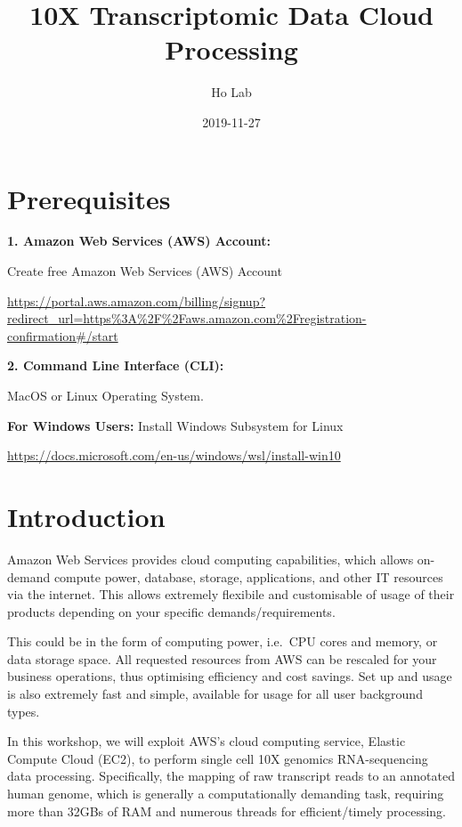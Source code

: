 \documentclass[]{book}
\title{10X Transcriptomic Data Cloud Processing}
\author{Ho Lab}
\date{2019-11-27}
\begin{document}
\maketitle

{
\setcounter{tocdepth}{1}
\tableofcontents
}
\hypertarget{prerequisites}{%
\chapter{Prerequisites}\label{prerequisites}}

\textbf{1. Amazon Web Services (AWS) Account:}

Create free Amazon Web Services (AWS) Account

\url{https://portal.aws.amazon.com/billing/signup?redirect_url=https\%3A\%2F\%2Faws.amazon.com\%2Fregistration-confirmation\#/start}

\textbf{2. Command Line Interface (CLI):}

MacOS or Linux Operating System.

\textbf{For Windows Users:}
Install Windows Subsystem for Linux

\url{https://docs.microsoft.com/en-us/windows/wsl/install-win10}

\hypertarget{intro}{%
\chapter{Introduction}\label{intro}}

Amazon Web Services provides cloud computing capabilities, which allows on-demand compute power, database, storage, applications, and other IT resources via the internet. This allows extremely flexibile and customisable of usage of their products depending on your specific demands/requirements.

This could be in the form of computing power, i.e.~CPU cores and memory, or data storage space. All requested resources from AWS can be rescaled for your business operations, thus optimising efficiency and cost savings. Set up and usage is also extremely fast and simple, available for usage for all user background types.

In this workshop, we will exploit AWS's cloud computing service, Elastic Compute Cloud (EC2), to perform single cell 10X genomics RNA-sequencing data processing. Specifically, the mapping of raw transcript reads to an annotated human genome, which is generally a computationally demanding task, requiring more than 32GBs of RAM and numerous threads for efficient/timely processing.
\end{document}
